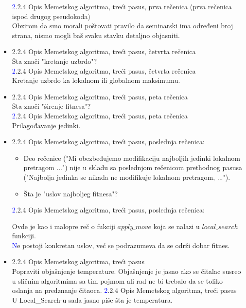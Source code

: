 \documentclass[a4paper]{report}
\newcommand{\odgovor}[1]{\textcolor{blue}{#1}}
\begin{document}
\begin{itemize}
   \odgovor 2.2.4 Opis Memetskog algoritma, treći pasus, prva rečenica (prva rečenica ispod drugog  pseudokoda) \\
   Obzirom da smo morali poštovati pravilo da seminarski ima određeni broj strana, nismo mogli baš svaku stavku detaljno objasniti.
  
    \item 2.2.4 Opis Memetskog algoritma, treći pasus, četvrta rečenica \\
    Šta znači "kretanje uzbrdo"?\\
     \odgovor 2.2.4 Opis Memetskog algoritma, treći pasus, četvrta rečenica \\
     Kretanje uzbrdo ka lokalnom ili globalnom maksimumu.
    
    \item 2.2.4 Opis Memetskog algoritma, treći pasus, peta rečenica \\
    Šta znači "širenje fitnesa"?\\
     \odgovor 2.2.4 Opis Memetskog algoritma, treći pasus, peta rečenica\\
    Prilagođavanje jedinki.\\
    

    \item 2.2.4 Opis Memetskog algoritma, treći pasus, poslednja rečenica: 
        \begin{itemize}
            \item Deo rečenice ("Mi obezbeđujemo modifikaciju najboljih jedinki lokalnom pretragom ...") nije u skladu sa poslednjom rečenicom prethodnog pasusa ("Najbolja jedinka se nikada ne
            modifikuje lokalnom pretragom, ...").
            \item Šta je "uslov najboljeg fitnesa"?
        \end{itemize}
        
     \odgovor  2.2.4 Opis Memetskog algoritma, treći pasus, poslednja rečenica: 
     
     Ovde je kao i malopre reč o fukciji
     $apply\_move$ koja se nalazi u  $local\_search$ funkciji. \\
     \odgovor Ne postoji konkretan uslov, već se podrazumeva da se održi dobar fitnes.
     
     
     
     
    \item 2.2.4 Opis Memetskog algoritma, treći pasus \\
    Popraviti objašnjenje temperature. Objašnjenje je jasno ako se čitalac susreo u sličnim algoritmima sa tim pojmom ali rad ne bi trebalo da se toliko oslanja na predznanje čitaoca.
    \odgovor2.2.4 Opis Memetskog algoritma, treći pasus \\ U Local\_Search-u sada jasno piše šta je temperatura.
    

\end{itemize}
\end{document}
